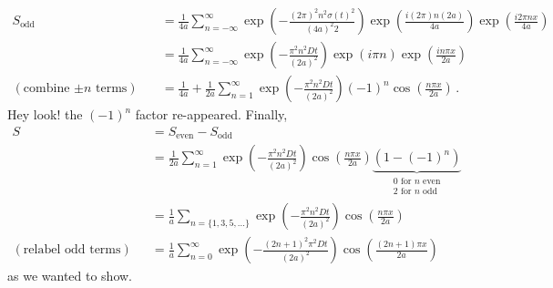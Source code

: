 \begin{align*}
  S_\text{odd}
  &= \frac{1}{4 a} \sum_{n=-\infty}^\infty
    \exp \left( - \frac{(2\pi)^2 n^2 \sigma(t)^2}{(4a)^2 2} \right)
    \exp \left( \frac{i (2\pi) n (2a)}{4a} \right)
    \exp \left( \frac{i 2 \pi n x}{4 a} \right) \\
  &= \frac{1}{4 a} \sum_{n=-\infty}^\infty
    \exp \left( - \frac{\pi^2 n^2 D t}{(2 a)^2} \right)
    \exp \left( i \pi n \right)
    \exp \left( \frac{i n \pi x}{2 a} \right) \\
  (\text{combine $\pm n$ terms}) \quad
  &= \frac{1}{4a} + \frac{1}{2a} \sum_{n=1}^\infty
    \exp \left( - \frac{\pi^2 n^2 D t}{(2 a)^2} \right)
    (-1)^n \cos \left( \frac{n \pi x}{2 a} \right)
  \, .
\end{align*}
Hey look! the $(-1)^n$ factor re-appeared.
Finally,
\begin{align*}
  S &= S_\text{even} - S_\text{odd} \\
  &= \frac{1}{2a} \sum_{n=1}^\infty
    \exp \left( - \frac{\pi^2 n^2 D t}{(2 a)^2} \right)
    \cos \left( \frac{n \pi x}{2a} \right)
    \underbrace{\left( 1 - (-1)^n \right)}_{\substack{\text{0 for $n$ even}\\ \text{2 for $n$ odd}}} \\
  &= \frac{1}{a} \sum_{n=\{1, 3, 5,\ldots\}}
    \exp \left( - \frac{\pi^2 n^2 D t}{(2 a)^2} \right)
    \cos \left( \frac{n \pi x}{2a} \right)\\
  (\text{relabel odd terms}) \quad
  &= \frac{1}{a} \sum_{n=0}^\infty
    \exp \left( - \frac{(2n + 1)^2 \pi^2 D t}{(2 a)^2} \right)
    \cos \left( \frac{(2n + 1) \pi x}{2a} \right)
\end{align*}
as we wanted to show.
